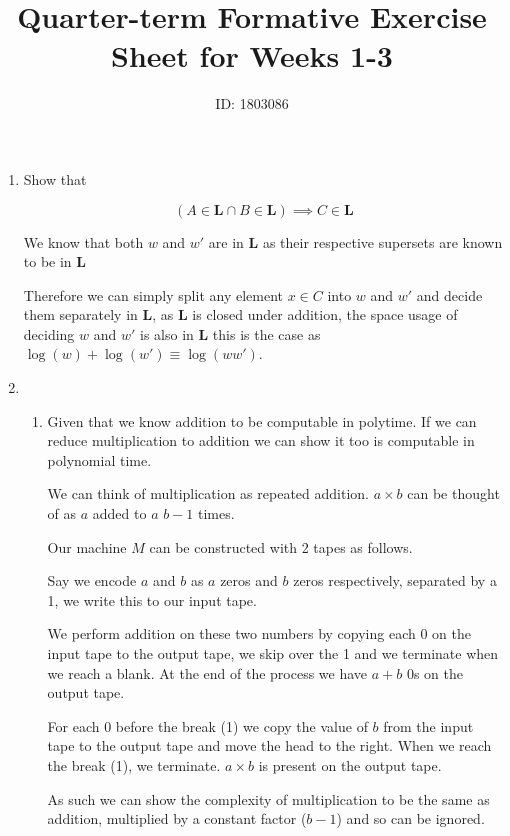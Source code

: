 \documentclass{article}
\title{Quarter-term Formative Exercise Sheet for Weeks 1-3}
\author{ID: 1803086}
\begin{document}
\maketitle

\begin{enumerate}
  \item Show that

        \[
        (A \in \mathbf{L} \cap B \in \mathbf{L} ) \implies C \in \mathbf{L}
        \]

        We know that both $w$ and $w'$ are in $\mathbf{L} $ as their respective supersets are known to be in $\mathbf{L} $

        Therefore we can simply split any element $x \in C$ into $w$ and $w'$ and decide them separately in $\mathbf{L} $, as $\mathbf{L} $ is closed under addition, the space usage of deciding $w$ and $w'$ is also in $\mathbf{L} $ this is the case as $\log(w) + \log(w') \equiv \log(ww')$.

  \item
        \begin{enumerate}
          \item
                Given that we know addition to be computable in polytime. If we can reduce multiplication to addition we can show it too is computable in polynomial time.

                We can think of multiplication as repeated addition. $a\times b$ can be thought of as $a$ added to $a$ $b-1$ times.


                Our machine $M$ can be constructed with 2 tapes as follows.

                Say we encode $a$ and $b$ as $a$ zeros and $b$ zeros respectively, separated by a 1, we write this to our input tape.

                We perform addition on these two numbers by copying each 0 on the input tape to the output tape, we skip over the 1 and we terminate when we reach a blank. At the end of the process we have $a+b$ 0s on the output tape.

                For each 0 before the break (1) we copy the value of $b$ from the input tape to the output tape and move the head to the right. When we reach the break (1), we terminate. $a\times b$ is present on the output tape.

                As such we can show the complexity of multiplication to be the same as addition, multiplied by a constant factor ($b-1$) and so can be ignored.


\end{enumerate}
\end{enumerate}
\end{document}
